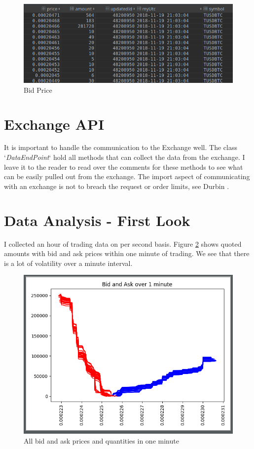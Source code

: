 \documentclass[12pt]{article}
\begin{document}
\begin{figure}[h!]
	\centering
  \includegraphics[scale=0.3]{bid.png}
  \caption{Bid Price}
  \label{fig:bid}
\end{figure}
\FloatBarrier

\section*{Exchange API}
It is important to handle the communication to the Exchange well. The class `\textit{DataEndPoint}` hold all methods that can collect the data from the exchange. I leave it to the reader to read over the comments for these methods to see what can be easily pulled out from the exchange. The import aspect of communicating with an exchange is not to breach the request or order limits, see Durbin \cite{durbin}.

\section*{Data Analysis - First Look}
I collected an hour of trading data on per second basis. Figure \ref{fig:plt1} shows quoted amounts with bid and ask prices within one minute of trading. We see that there is a lot of volatility over a minute interval.
\begin{figure}[h!]
	\centering
  \includegraphics[scale=0.5]{plot1.png}
  \caption{All bid and ask prices and quantities in one minute}
  \label{fig:plt1}
\end{figure}
\FloatBarrier
\end{document}
